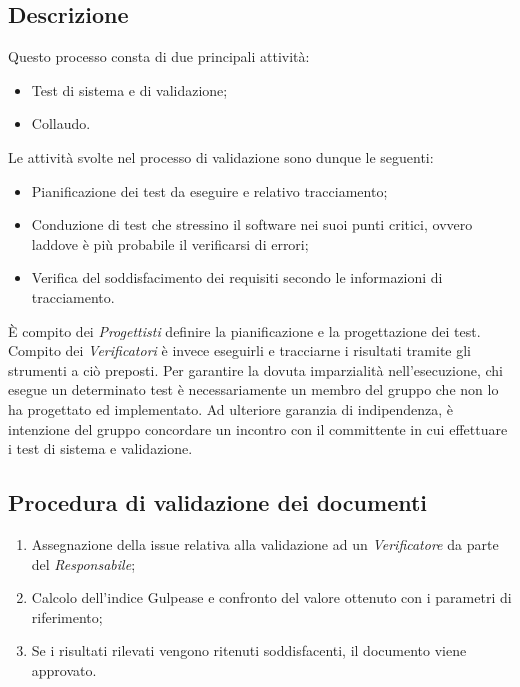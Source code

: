 \documentclass[../NormediProgetto.tex]{subfiles}
\begin{document}
\subsection{Descrizione}

Questo processo consta di due principali attività:

\begin{itemize}
    \item Test di sistema e di validazione;
    \item Collaudo.
\end{itemize}

Le attività svolte nel processo di validazione sono dunque le seguenti:

\begin{itemize}
    \item Pianificazione dei test da eseguire e relativo tracciamento;
    
    \item Conduzione di test che stressino il software nei suoi punti critici, ovvero laddove è più probabile il verificarsi di errori;
    
    \item Verifica del soddisfacimento dei requisiti secondo le informazioni di tracciamento.
\end{itemize}

È compito dei \textit{Progettisti} definire la pianificazione e la progettazione dei test. Compito dei \textit{Verificatori} è invece eseguirli e tracciarne i risultati tramite gli strumenti a ciò preposti. Per garantire la dovuta imparzialità nell'esecuzione, chi esegue un determinato test è necessariamente un membro del gruppo che non lo ha progettato ed implementato. Ad ulteriore garanzia di indipendenza, è intenzione del gruppo concordare un incontro con il committente in cui effettuare i test di sistema e validazione.

\subsection{Procedura di validazione dei documenti}

\begin{enumerate}
    \item Assegnazione della issue relativa alla validazione ad un \textit{Verificatore} da parte del \textit{Responsabile};
    
    \item Calcolo dell'indice Gulpease e confronto del valore ottenuto con i parametri di riferimento;
    
    \item Se i risultati rilevati vengono ritenuti soddisfacenti, il documento viene approvato.
\end{enumerate}
\end{document}
